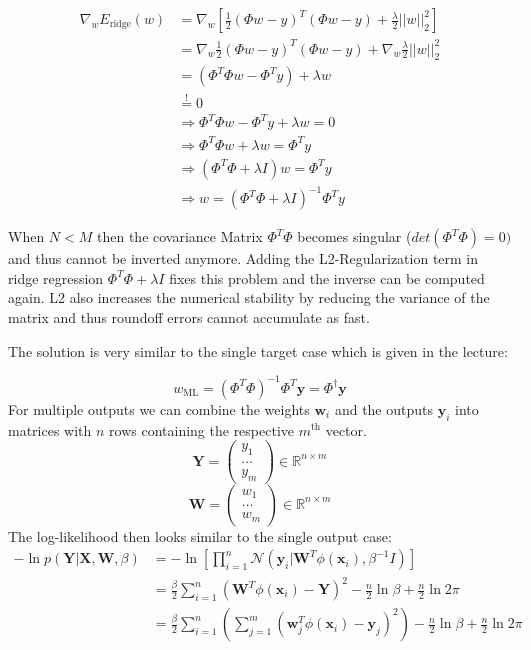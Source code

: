 %
\newpage
{}
%
\begin{align*}
\nabla_w E_\text{ridge}(w) &= \nabla_w \left[\frac{1}{2} (\Phi w - y)^T (\Phi w - y) + \frac{\lambda}{2} ||w||^2_2 \right] \\
&= \nabla_w \frac{1}{2} (\Phi w - y)^T (\Phi w - y) + \nabla_w \frac{\lambda}{2} ||w||^2_2 \\
&= (\Phi^T \Phi w - \Phi^T y) + \lambda w \\
&\overset{!}{=} 0 \\
&\Rightarrow \Phi^T\Phi w - \Phi^T y + \lambda w = 0 \\
&\Rightarrow \Phi^T\Phi w  + \lambda w = \Phi^T y \\
&\Rightarrow (\Phi^T \Phi + \lambda I) w = \Phi^T y \\
&\Rightarrow w = (\Phi^T \Phi + \lambda I)^{-1} \Phi^T y
\end{align*}
\begin{flushleft}
  When $N < M$ then the covariance Matrix $\Phi^T \Phi$ becomes singular ($det(\Phi^T\Phi) = 0)$ and thus cannot be inverted anymore. Adding the L2-Regularization term in ridge regression $\Phi^T \Phi + \lambda I$ fixes this problem and the inverse can be computed again. L2 also increases the numerical stability by reducing the variance of the matrix and thus roundoff errors cannot accumulate as fast.
\end{flushleft}
%
%
%
\begin{flushleft}
The solution is very similar to the single target case which is given in the lecture:
\end{flushleft}
\[ w_\text{ML} = (\Phi^T \Phi)^{-1} \Phi^T \mathbf{y} = \Phi^\dagger \mathbf{y} \]
For multiple outputs we can combine the weights $\mathbf{w}_i$ and the outputs $\mathbf{y}_i$ into matrices with $n$ rows containing the respective $m^\text{th}$ vector. 
\[ \mathbf{Y} = \begin{pmatrix}y_1 \\ \ldots \\ y_m \end{pmatrix} \in \mathbb{R}^{n\times m} \]
\[ \mathbf{W} = \begin{pmatrix}w_1 \\ \ldots \\ w_m \end{pmatrix} \in \mathbb{R}^{n\times m} \]
The log-likelihood then looks similar to the single output case:
\begin{align*}
- \ln p(\mathbf{Y} | \mathbf{X}, \mathbf{W}, \beta) &= - \ln \left[ \prod_{i=1}^n \mathcal{N}(\mathbf{y}_i | \mathbf{W}^T \phi(\mathbf{x}_i), \beta^{-1} I) \right] \\
&= \frac{\beta}{2} \sum_{i=1}^n (\mathbf{W}^T \phi(\mathbf{x}_i) - \mathbf{Y})^2 - \frac{n}{2} \ln \beta + \frac{n}{2} \ln 2 \pi \\
&= \frac{\beta}{2} \sum_{i=1}^n \left(\sum_{j=1}^m (\mathbf{w}_j^T \phi(\mathbf{x}_i) - \mathbf{y}_{j})^2\right) - \frac{n}{2} \ln \beta + \frac{n}{2} \ln 2 \pi \\
\end{align*}
